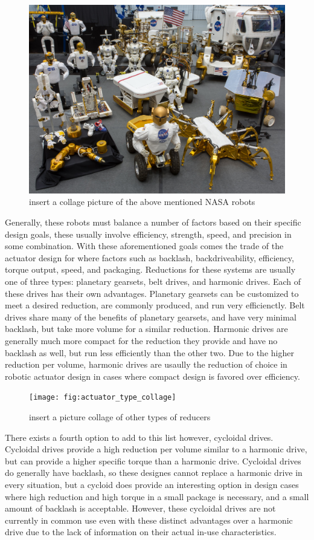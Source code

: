 \begin{figure}[!b]
   \centering
   \includegraphics[width=0.7\linewidth]{fig/robot_collage}
   \caption{insert a collage picture of the above mentioned NASA robots}
   \label{fig/robot_collage}
\end{figure}


Generally, these robots must balance a number of factors based on their specific design goals, these usually involve efficiency, strength, speed, and precision in some combination. 
With these aforementioned goals comes the trade of the actuator design for where factors such as backlash, backdriveability, efficiency, torque output, speed, and packaging. 
Reductions for these systems are usually one of three types: planetary gearsets, belt drives, and harmonic drives. 
Each of these drives has their own advantages. 
Planetary gearsets can be customized to meet a desired reduction, are commonly produced, and run very efficienctly.
Belt drives share many of the benefits of planetary gearsets, and have very minimal backlash, but take more volume for a similar reduction. 
Harmonic drives are generally much more compact for the reduction they provide and have no backlash as well, but run less efficiently than the other two. 
Due to the higher reduction per volume, harmonic drives are usaully the reduction of choice in robotic actuator design in cases where compact design is favored over efficiency.

\begin{figure}[!b]
   \centering
   \texttt{[image: fig:actuator\_type\_collage]}
   \caption{insert a picture collage of other types of reducers}
   \label{fig/reducer_collage}
\end{figure}

There exists a fourth option to add to this list however, cycloidal drives. 
Cycloidal drives provide a high reduction per volume similar to a harmonic drive, but can provide a higher specific torque than a harmonic drive. 
Cycloidal drives do generally have backlash, so these designes cannot replace a harmonic drive in every situation, but a cycloid does provide an interesting option in design cases where high reduction and high torque in a small package is necessary, and a small amount of backlash is acceptable. 
However, these cycloidal drives are not currently in common use even with these distinct advantages over a harmonic drive due to the lack of information on their actual in-use characteristics. 

